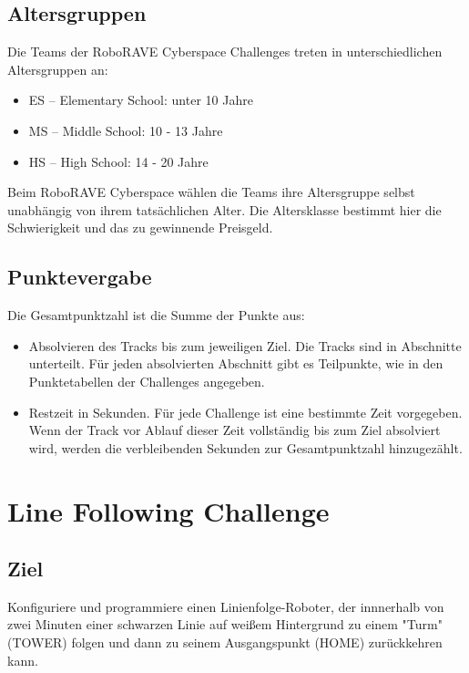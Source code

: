 \documentclass[a4paper,12pt]{article}
\begin{document}
\subsection{Altersgruppen}

Die Teams der RoboRAVE Cyberspace Challenges treten in unterschiedlichen
Altersgruppen an:

\begin{itemize}
	\item ES – Elementary School: unter 10 Jahre
	\item MS – Middle School: 10 - 13 Jahre
	\item HS – High School: 14 - 20 Jahre
\end{itemize}

Beim RoboRAVE Cyberspace wählen die Teams ihre Altersgruppe selbst unabhängig
von ihrem tatsächlichen Alter. Die Altersklasse bestimmt hier die Schwierigkeit
und das zu gewinnende Preisgeld.

\subsection{Punktevergabe}

Die Gesamtpunktzahl ist die Summe der Punkte aus:
\begin{itemize}
	\item Absolvieren des Tracks bis zum jeweiligen Ziel. Die Tracks sind
in Abschnitte unterteilt. Für jeden absolvierten Abschnitt gibt es Teilpunkte,
wie in den Punktetabellen der Challenges angegeben.
	\item Restzeit in Sekunden. Für jede Challenge ist eine bestimmte Zeit
vorgegeben. Wenn der Track vor Ablauf dieser Zeit vollständig bis zum Ziel
absolviert wird, werden die verbleibenden Sekunden zur Gesamtpunktzahl
hinzugezählt.
\end{itemize}

\section{Line Following Challenge}

\subsection{Ziel}

Konfiguriere und programmiere einen Linienfolge-Roboter, der innnerhalb von
zwei Minuten einer schwarzen Linie auf weißem Hintergrund zu einem "Turm"
(TOWER) folgen und dann zu seinem Ausgangspunkt (HOME) zurückkehren kann.
\end{document}

